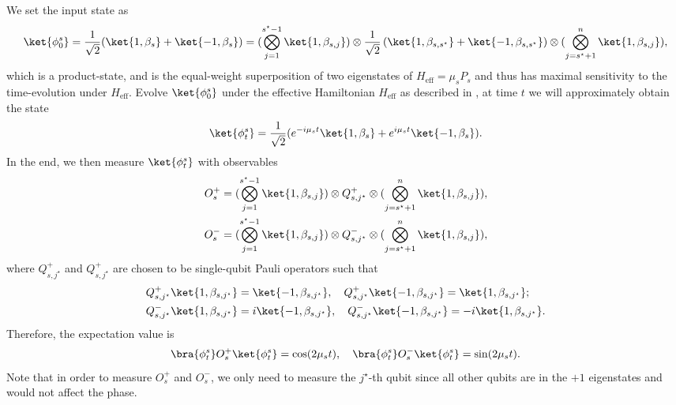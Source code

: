 \documentclass[twocolumn,superscriptaddress,aps,showpacs,amsmath,amstex,amssymb,citeautoscript,floatfix,pra,preprintnumbers]{revtex4-2}
\theoremstyle{plain}
\theoremstyle{plain}
\theoremstyle{plain}
\theoremstyle{plain}
\theoremstyle{plain}
\theoremstyle{plain}
\begin{document}
\begin{appendix}
We set the input state as
\begin{equation}
\label{eq:initial_state}
        \ket{\phi^s_0} = \frac{1}{\sqrt{2}}(\ket{1,\beta_s} + \ket{-1,\beta_s}) = (\bigotimes_{j=1}^{s^\star-1} \ket{1,\beta_{s,j}}) \otimes \frac{1}{\sqrt{2}}\left(\ket{1,\beta_{s,s^\star}} + \ket{-1,\beta_{s,s^\star}}\right) \otimes (\bigotimes_{j=s^\star+1}^{n} \ket{1,\beta_{s,j}}),
\end{equation}
which is a product-state, and is the equal-weight superposition of two eigenstates of $H_{\mathrm{eff}} = \mu_s P_s$ and thus has maximal sensitivity to the time-evolution under $H_{\mathrm{eff}}$. Evolve $\ket{\phi^s_0}$ under the effective Hamiltonian $H_{\mathrm{eff}}$ as described in , at time $t$ we will approximately obtain the state
\begin{equation}
\label{eq:exact_state_phase_estimation_experiment}
        \ket{\phi^s_t} = \frac{1}{\sqrt{2}}(e^{-i\mu_st}\ket{1,\beta_s} + e^{i\mu_st}\ket{-1,\beta_s}).
\end{equation}
In the end, we then measure $\ket{\phi^s_t}$ with observables
\begin{equation}
\label{eq:obs_RFE}
\begin{split}
    O^+_s &= (\bigotimes_{j=1}^{s^\star-1} \ket{1,\beta_{s,j}}) \otimes Q^+_{s,j^\star} \otimes (\bigotimes_{j=s^\star+1}^{n} \ket{1,\beta_{s,j}}),\\
    O^-_s &= (\bigotimes_{j=1}^{s^\star-1} \ket{1,\beta_{s,j}}) \otimes Q^-_{s,j^\star} \otimes (\bigotimes_{j=s^\star+1}^{n} \ket{1,\beta_{s,j}}),
\end{split}
\end{equation}
where $Q^+_{s,j^\star}$ and $Q^+_{s,j^\star}$ are chosen to be single-qubit Pauli operators such that
\begin{equation}
\label{eq:Q_j-star}
\begin{split}
    Q^+_{s,j^\star}\ket{1,\beta_{s,j^\star}} &= \ket{-1,\beta_{s,j^\star}},\quad Q^+_{s,j^\star}\ket{-1,\beta_{s,j^\star}} = \ket{1,\beta_{s,j^\star}};\\
    Q^-_{s,j^\star}\ket{1,\beta_{s,j^\star}} &= i\ket{-1,\beta_{s,j^\star}},\quad Q^-_{s,j^\star}\ket{-1,\beta_{s,j^\star}} = -i\ket{1,\beta_{s,j^\star}}.
\end{split}
\end{equation}
Therefore, the expectation value is
\begin{equation}
    \bra{\phi^s_t}O^+_s\ket{\phi^s_t} = \cos(2\mu_s t),\quad \bra{\phi^s_t}O^-_s\ket{\phi^s_t} = \sin(2\mu_s t).
\end{equation}
Note that in order to measure $O^+_s$ and $O^-_s$, we only need to measure the $j^\star$-th qubit since all other qubits are in the $+1$ eigenstates and would not affect the phase.


\end{appendix}
\end{document}
